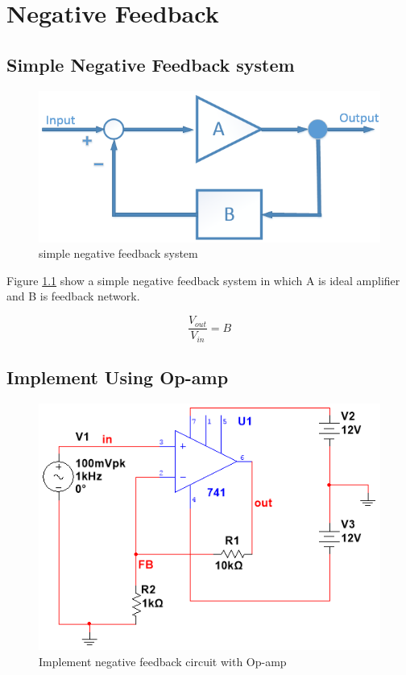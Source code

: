 \chapter{Negative Feedback}
\section{Simple Negative Feedback system}

\begin{figure}[htbp]
	\centering
	\includegraphics[scale=0.6]{"../Photo/Chap2/Feedback system"}
	\caption{simple negative feedback system}
	\label{fig:Feedback system}
\end{figure}

Figure \ref{fig:Feedback system} show a simple negative feedback system in which A is ideal amplifier and B is feedback network. 

\[  \frac{V_{out}}{V_{in}} = B  \] 

\section{Implement Using Op-amp}


\begin{figure}[htbp]
	\centering
	\includegraphics[scale=0.6]{"../Photo/Chap2/Op-amp feedback"}
	\caption{Implement negative feedback circuit with Op-amp}
	\label{fig:Op-amp feedback}
\end{figure}


